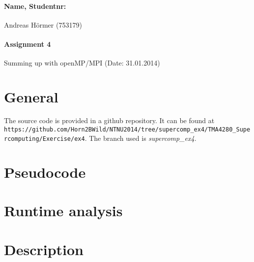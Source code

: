 \documentclass{article}
\begin{document}
\paragraph{Name, Studentnr: }Andreas H\"ormer (753179)
\paragraph{Assignment 4}Summing up with openMP/MPI (Date: 31.01.2014)

	\section{General}
		The source code is provided in a github repository. It can be found at\\
		\texttt{https://github.com/Horn2BWild/NTNU2014/tree/supercomp_ex4/TMA4280_Supercomputing/Exercise/ex4}. The branch used is \textit{supercomp\_ex4}.
	\section{Pseudocode}
	\section{Runtime analysis}
	\section{Description}
\end{document}
